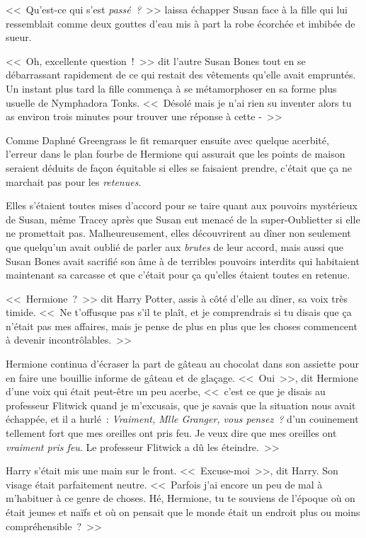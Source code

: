 <<~Qu'est-ce qui s'est \emph{passé~?}~>> laissa échapper Susan face à la fille qui lui ressemblait comme deux gouttes d'eau mis à part la robe écorchée et imbibée de sueur.

<<~Oh, excellente question~!~>> dit l'autre Susan Bones tout en se débarrassant rapidement de ce qui restait des vêtements qu'elle avait empruntés. Un instant plus tard la fille commença à se métamorphoser en sa forme plus usuelle de Nymphadora Tonks. <<~Désolé mais je n'ai rien su inventer alors tu as environ trois minutes pour trouver une réponse à cette -~>>

\later

Comme Daphné Greengrass le fit remarquer ensuite avec quelque acerbité, l'erreur dans le plan fourbe de Hermione qui assurait que les points de maison seraient déduits de façon équitable si elles se faisaient prendre, c'était que ça ne marchait pas pour les \emph{retenues}.

Elles s'étaient toutes mises d'accord pour se taire quant aux pouvoirs mystérieux de Susan, même Tracey après que Susan eut menacé de la super-Oublietter si elle ne promettait pas. Malheureusement, elles découvrirent au dîner non seulement que quelqu'un avait oublié de parler aux \emph{brutes} de leur accord, mais aussi que Susan Bones avait sacrifié son âme à de terribles pouvoirs interdits qui habitaient maintenant sa carcasse et que c'était pour ça qu'elles étaient toutes en retenue.

<<~Hermione~?~>> dit Harry Potter, assis à côté d'elle au dîner, sa voix très timide. <<~Ne t'offusque pas s'il te plaît, et je comprendrais si tu disais que ça n'était pas mes affaires, mais je pense de plus en plus que les choses commencent à devenir incontrôlables.~>>

Hermione continua d'écraser la part de gâteau au chocolat dans son assiette pour en faire une bouillie informe de gâteau et de glaçage. <<~Oui~>>, dit Hermione d'une voix qui était peut-être un peu acerbe, <<~c'est ce que je disais au professeur Flitwick quand je m'excusais, que je savais que la situation nous avait échappée, et il a hurlé~: \emph{Vraiment, Mlle Granger, vous pensez~?} d'un couinement tellement fort que mes oreilles ont pris feu. Je veux dire que mes oreilles ont \emph{vraiment pris feu}. Le professeur Flitwick a dû les éteindre.~>>

Harry s'était mis une main sur le front. <<~Excuse-moi~>>, dit Harry. Son visage était parfaitement neutre. <<~Parfois j'ai encore un peu de mal à m'habituer à ce genre de choses. Hé, Hermione, tu te souviens de l'époque où on était jeunes et naïfs et où on pensait que le monde était un endroit plus ou moins compréhensible~?~>>

